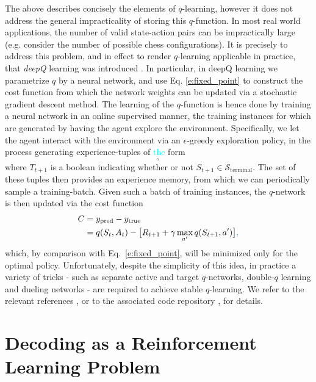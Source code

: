 \documentclass[twocolumn,preprintnumbers,amsmath,amssymb,notitlepage,nofootinbib,longbibliography,superscriptaddress,aps,pra,10pt]{revtex4-1}
\newcommand{\je}[1]{\textcolor{cyan}{#1}}
\begin{document}
	The above describes concisely the elements of $q$-learning, however it does not address the general impracticality of storing this $q$-function.
	In most real world applications, the number of valid state-action pairs can be impractically large (e.g. consider the number of possible chess configurations).
	It is precisely to address this problem, and in effect to render $q$-learning applicable in practice, that \textit{deepQ} learning was introduced \cite{RLMnih15,RLvan2016deep,RLschaul2015prioritized}.
	In particular, in deepQ learning we parametrize $q$ by a neural network, and use Eq. \eqref{e:fixed_point} to construct the cost function from which the network weights can be updated via a stochastic gradient descent method.
	The learning of the $q$-function is hence done by training a neural network in an online supervised manner, the training instances for which are generated by having the agent explore the environment.
	Specifically, we let the agent interact with the environment via an $\epsilon$-greedy exploration policy, in the process generating experience-tuples of \je{the} 
	form
	\begin{equation}
		[S_t,A_t,R_{t+1},S_{t+1},T_{t+1}],
	\end{equation}
	where $T_{t+1}$ is a boolean indicating whether or not $S_{t+1} \in \mathcal{S}_\mathrm{terminal}$.
	The set of these tuples then provides an experience memory, from which we can periodically sample a training-batch.
	Given such a batch of training instances, the $q$-network is then updated via the cost function
	\begin{align} 
		C &= y_{\mathrm{pred}} - y_{\mathrm{true}}\\
		&= q(S_t,A_t) - \big[R_{t+1} + \gamma\max_{a'}q(S_{t+1},a') \big]\je{,}
	\end{align}
	which, by comparison with Eq.~\eqref{e:fixed_point}, will be minimized only for the optimal policy.
	Unfortunately, despite the simplicity of this idea, in practice a variety of tricks - such as separate active and target $q$-networks, double-$q$ learning and dueling networks - are required to achieve stable $q$-learning.
	We refer to the relevant references \cite{RLMnih15,RLvan2016deep,RLschaul2015prioritized,RLwang2015dueling}, or to the associated code repository \cite{DeepQDecoding}, for details.

\section{Decoding as a Reinforcement Learning Problem}\label{s:decoding_as_rl}
\end{document}
